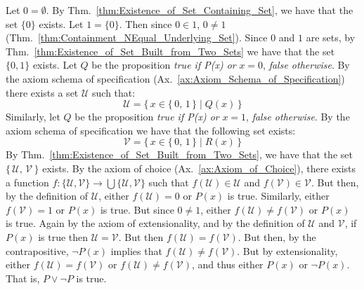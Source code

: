         \begin{bproof}
            Let $0=\emptyset$. By
            Thm.~\ref{thm:Existence_of_Set_Containing_Set}, we have that the set
            $\{0\}$ exists. Let $1=\{0\}$. Then since $0\in{1}$, $0\ne{1}$
            (Thm.~\ref{thm:Containment_NEqual_Underlying_Set}). Since $0$ and
            $1$ are sets, by Thm.~\ref{thm:Existence_of_Set_Built_from_Two_Sets}
            we have that the set $\{0,1\}$ exists. Let $Q$ be the proposition
            \textit{true if P(x) or } $x=0$, \textit{false otherwise}. By the
            axiom schema of specification
            (Ax.~\ref{ax:Axiom_Schema_of_Specification}) there exists a set
            $\mathcal{U}$ such that:
            \begin{equation}
                \mathcal{U}=\{\,x\in\{\,0,\,1\,\}\;|\;Q(x)\,\}
            \end{equation}
            Similarly, let $Q$ be the proposition \textit{true if P(x) or}
            $x=1$, \textit{false otherwise}. By the axiom schema of
            specification we have that the following set exists:
            \begin{equation}
                \mathcal{V}=\{\,x\in\{\,0,\,1\,\}\;|\;R(x)\,\}
            \end{equation}
            By Thm.~\ref{thm:Existence_of_Set_Built_from_Two_Sets}, we have that
            the set $\{\,\mathcal{U},\,\mathcal{V}\,\}$ exists. By the axiom of
            choice (Ax.~\ref{ax:Axiom_of_Choice}), there exists a function
            $f:\{\mathcal{U},\mathcal{V}\}\rightarrow%
             \bigcup\{\mathcal{U},\mathcal{V}\}$ such that
            $f(\mathcal{U})\in\mathcal{U}$ and $f(\mathcal{V})\in\mathcal{V}$.
            But then, by the definition of $\mathcal{U}$, either
            $f(\mathcal{U})=0$ or $P(x)$ is true. Similarly, either
            $f(\mathcal{V})=1$ or $P(x)$ is true. But since $0\ne{1}$, either
            $f(\mathcal{U})\ne{f}(\mathcal{V})$ or $P(x)$ is true. Again by the
            axiom of extensionality, and by the definition of $\mathcal{U}$ and
            $\mathcal{V}$, if $P(x)$ is true then $\mathcal{U}=\mathcal{V}$. But
            then $f(\mathcal{U})=f(\mathcal{V})$. But then, by the
            contrapositive, $\neg{P}(x)$ implies that
            $f(\mathcal{U})\ne{f}(\mathcal{V})$. But by extensionality, either
            $f(\mathcal{U})=f(\mathcal{V})$ or
            $f(\mathcal{U})\ne{f}(\mathcal{V})$, and thus either $P(x)$ or
            $\neg{P}(x)$. That is, $P\lor\neg{P}$ is true.
        \end{bproof}
